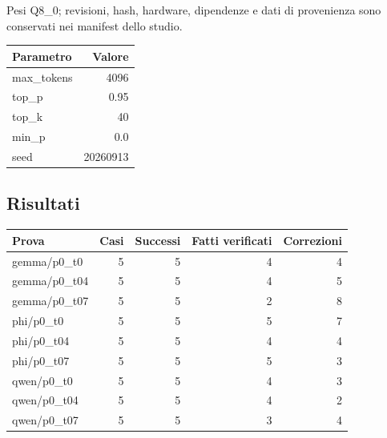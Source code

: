 Pesi Q8\_0; revisioni, hash, hardware, dipendenze e dati di provenienza sono conservati nei manifest dello studio.

\begin{center}\begin{tabular}{lr}\toprule Parametro & Valore\\\midrule

max\_tokens & 4096\\

top\_p & 0.95\\

top\_k & 40\\

min\_p & 0.0\\

seed & 20260913\\

\bottomrule\end{tabular}\end{center}

\subsection{Risultati}

\begin{center}\small\begin{tabular}{lrrrr}\toprule Prova & Casi & Successi & Fatti verificati & Correzioni\\\midrule

gemma/p0\_t0 & 5 & 5 & 4 & 4\\

gemma/p0\_t04 & 5 & 5 & 4 & 5\\

gemma/p0\_t07 & 5 & 5 & 2 & 8\\

phi/p0\_t0 & 5 & 5 & 5 & 7\\

phi/p0\_t04 & 5 & 5 & 4 & 4\\

phi/p0\_t07 & 5 & 5 & 5 & 3\\

qwen/p0\_t0 & 5 & 5 & 4 & 3\\

qwen/p0\_t04 & 5 & 5 & 4 & 2\\

qwen/p0\_t07 & 5 & 5 & 3 & 4\\

\bottomrule\end{tabular}\end{center}

